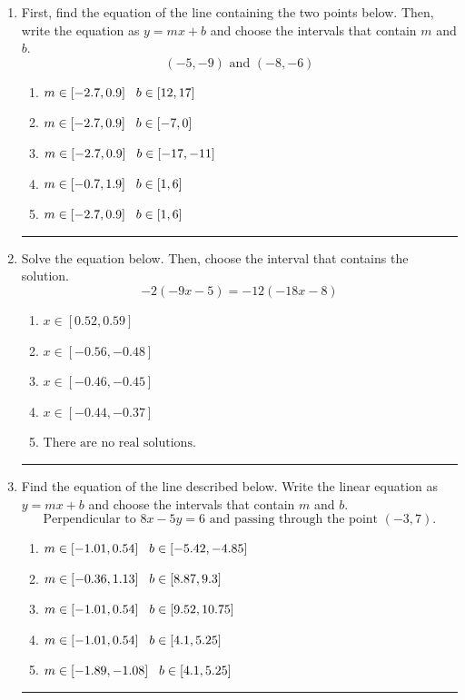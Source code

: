 \documentclass[14pt]{extbook}
\newcommand{\litem}[1]{\item#1\hspace*{-1cm}\rule{\textwidth}{0.4pt}}
\begin{document}
\begin{enumerate}
{\begin{enumerate}[label=\Alph*.]
\end{enumerate} }
\litem{
First, find the equation of the line containing the two points below. Then, write the equation as $ y=mx+b $ and choose the intervals that contain $m$ and $b$.\[ (-5, -9) \text{ and } (-8, -6) \]\begin{enumerate}[label=\Alph*.]
\item \( m \in [-2.7, 0.9] \hspace*{3mm} b \in [12, 17] \)
\item \( m \in [-2.7, 0.9] \hspace*{3mm} b \in [-7, 0] \)
\item \( m \in [-2.7, 0.9] \hspace*{3mm} b \in [-17, -11] \)
\item \( m \in [-0.7, 1.9] \hspace*{3mm} b \in [1, 6] \)
\item \( m \in [-2.7, 0.9] \hspace*{3mm} b \in [1, 6] \)

\end{enumerate} }
\litem{
Solve the equation below. Then, choose the interval that contains the solution.\[ -2(-9x -5) = -12(-18x -8) \]\begin{enumerate}[label=\Alph*.]
\item \( x \in [0.52, 0.59] \)
\item \( x \in [-0.56, -0.48] \)
\item \( x \in [-0.46, -0.45] \)
\item \( x \in [-0.44, -0.37] \)
\item \( \text{There are no real solutions.} \)

\end{enumerate} }
\litem{
Find the equation of the line described below. Write the linear equation as $ y=mx+b $ and choose the intervals that contain $m$ and $b$.\[ \text{Perpendicular to } 8 x - 5 y = 6 \text{ and passing through the point } (-3, 7). \]\begin{enumerate}[label=\Alph*.]
\item \( m \in [-1.01, 0.54] \hspace*{3mm} b \in [-5.42, -4.85] \)
\item \( m \in [-0.36, 1.13] \hspace*{3mm} b \in [8.87, 9.3] \)
\item \( m \in [-1.01, 0.54] \hspace*{3mm} b \in [9.52, 10.75] \)
\item \( m \in [-1.01, 0.54] \hspace*{3mm} b \in [4.1, 5.25] \)
\item \( m \in [-1.89, -1.08] \hspace*{3mm} b \in [4.1, 5.25] \)

\end{enumerate} }
\end{enumerate}
\end{document}
